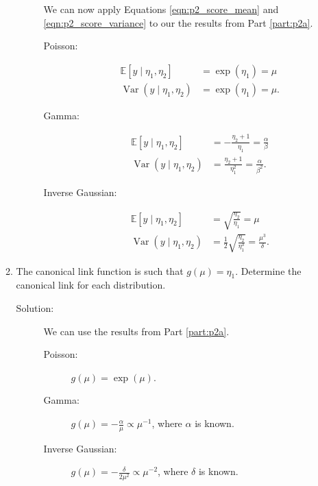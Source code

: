 \documentclass[letterpaper,11pt]{article}
\begin{document}
\begin{enumerate}
\begin{enumerate}
\begin{description}
      We can now apply Equations \ref{eqn:p2_score_mean} and
      \ref{eqn:p2_score_variance} to our the results from Part \ref{part:p2a}.
      \begin{description}
      \item[Poisson:]
        \begin{align*}
          \mathbb{E}\left[y \mid \eta_1, \eta_2\right]
          &= \exp\left(\eta_1\right) = \mu \\
          \operatorname{Var}\left(y \mid \eta_1, \eta_2\right)
          &= \exp\left(\eta_1\right) = \mu.
        \end{align*}
      \item[Gamma:]
        \begin{align*}
          \mathbb{E}\left[y \mid \eta_1, \eta_2\right]
          &= -\frac{\eta_2 + 1}{\eta_1} = \frac{\alpha}{\beta} \\
          \operatorname{Var}\left(y \mid \eta_1, \eta_2\right)
          &= \frac{\eta_2 + 1}{\eta_1^2} = \frac{\alpha}{\beta^2}.
        \end{align*}
      \item[Inverse Gaussian:]
        \begin{align*}
          \mathbb{E}\left[y \mid \eta_1, \eta_2\right]
          &= \sqrt{\frac{\eta_2}{\eta_1}} = \mu \\
          \operatorname{Var}\left(y \mid \eta_1, \eta_2\right)
          &= \frac{1}{2}\sqrt{\frac{\eta_2}{\eta_1^3}} = \frac{\mu^3}{\delta}.
        \end{align*}
      \end{description}
    \end{description}

  \item The canonical link function is such that $g(\mu) = \eta_1$. Determine the
    canonical link for each distribution.
    \begin{description}
    \item[Solution:] We can use the results from Part \ref{part:p2a}.
      \begin{description}
      \item[Poisson:] $\displaystyle g(\mu) = \exp(\mu)$.
      \item[Gamma:] $\displaystyle g(\mu) = -\frac{\alpha}{\mu} \propto \mu^{-1}$,
        where $\alpha$ is known.
      \item[Inverse Gaussian:]
        $\displaystyle g(\mu) = -\frac{\delta}{2\mu^2} \propto \mu^{-2}$, where $\delta$ is
        known.
      \end{description}
    \end{description}
  \end{enumerate}
\end{enumerate}
\end{document}
